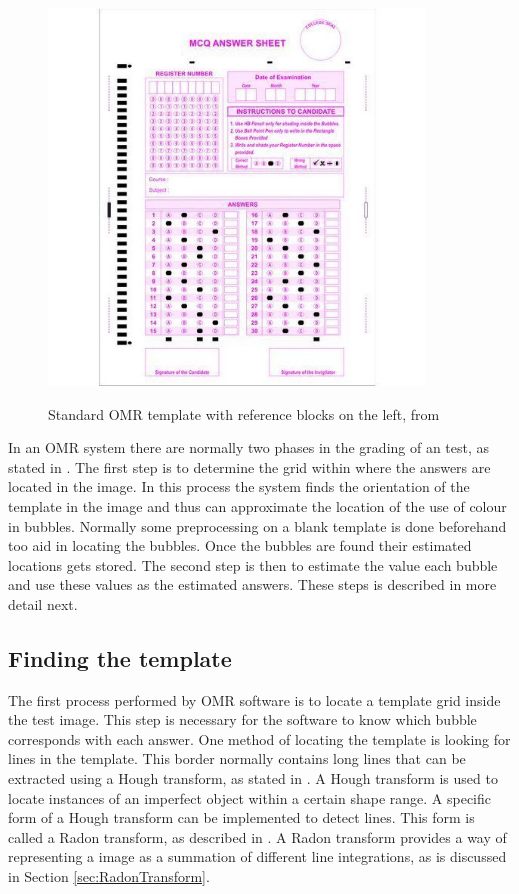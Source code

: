 \begin{figure}
  \centering
  \includegraphics[width=10cm]{omrTemplate}\\
  \caption{Standard OMR template with reference blocks on the left, from \citet{stdTemplate}}
  \label{fig:omrTemplate}
\end{figure}

In an OMR system there are normally two phases in the grading of an test, as stated in \citet{DraganI2003}. The first step is to determine the grid within where the answers are located in the image. In this process the system finds the orientation of the template in the image and thus can approximate the location of the use of colour in bubbles. Normally some preprocessing on a blank template is done beforehand too aid in locating the bubbles. Once the bubbles are found their estimated locations gets stored. The second step is then to estimate the value each bubble and use these values as the estimated answers. These steps is described in more detail next.

\subsection{Finding the template}

The first process performed by OMR software is to locate a template grid inside the test image. This step is necessary for the software to know which bubble corresponds with each answer. One method of locating the template is looking for lines in the template. This border normally contains long lines that can be extracted using a Hough transform, as stated in \citet{MVGI2015}. A Hough transform is used to locate instances of an imperfect object within a certain shape range. A specific form of a Hough transform can be implemented to detect lines. This form is called a Radon transform, as described in \citet{MathWorks}. A Radon transform provides a way of representing a image as a summation of different line integrations, as is discussed in Section \ref{sec:RadonTransform}. 

